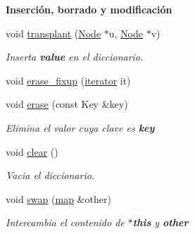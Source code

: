 \begin{Indent}{\bf \-Inserción, borrado y modificación}
\begin{DoxyCompactItemize}
void \hyperlink{classaed2_1_1map_a98b9f200c64ce02dfb67902ee00e375a_a98b9f200c64ce02dfb67902ee00e375a}{transplant} (\hyperlink{structaed2_1_1map_1_1Node}{\-Node} $\ast$u, \hyperlink{structaed2_1_1map_1_1Node}{\-Node} $\ast$v)
\begin{DoxyCompactList}\small\item\em \-Inserta {\bfseries value} en el diccionario. \end{DoxyCompactList}\item 
void \hyperlink{classaed2_1_1map_a7870c8f26e82b00d0aeb2e9f331dfec6_a7870c8f26e82b00d0aeb2e9f331dfec6}{erase\-\_\-fixup} (\hyperlink{classaed2_1_1map_1_1iterator}{iterator} it)
\item 
void \hyperlink{classaed2_1_1map_a2ffadb42cd5f0bc7b3752ff159b75334_a2ffadb42cd5f0bc7b3752ff159b75334}{erase} (const \-Key \&key)
\begin{DoxyCompactList}\small\item\em \-Elimina el valor cuya clave es {\bfseries key} \end{DoxyCompactList}\item 
void \hyperlink{classaed2_1_1map_a2bfa5165825979bf2431db55bc6bc9ca_a2bfa5165825979bf2431db55bc6bc9ca}{clear} ()
\begin{DoxyCompactList}\small\item\em \-Vacia el diccionario. \end{DoxyCompactList}\item 
void \hyperlink{classaed2_1_1map_a43ddb71cc91e5c6021a7a1f243d6cc4a_a43ddb71cc91e5c6021a7a1f243d6cc4a}{swap} (\hyperlink{classaed2_1_1map}{map} \&other)
\begin{DoxyCompactList}\small\item\em \-Intercambia el contenido de {\bfseries $\ast$this} y {\bfseries other} \end{DoxyCompactList}\end{DoxyCompactItemize}
\end{Indent}
